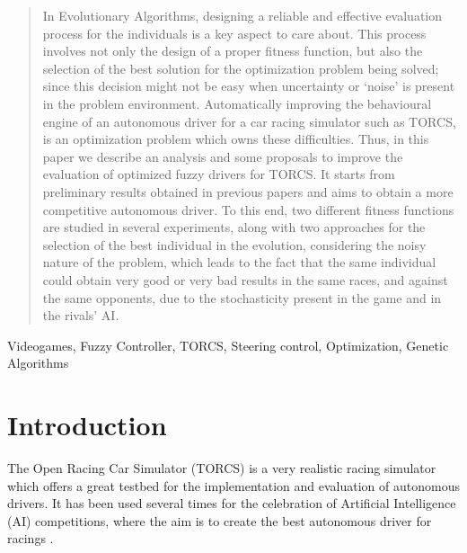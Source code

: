 \documentclass[conference]{IEEEtran}
\begin{document}
\begin{abstract}
	
In Evolutionary Algorithms, designing a reliable and effective evaluation process for the individuals is a key aspect to care about. This process involves not only the design of a proper fitness function, but also the selection of the best solution for the optimization problem being solved; since this decision might not be easy when uncertainty or `noise' is present in the problem environment.
Automatically improving the behavioural engine of an autonomous driver for a car racing simulator such as TORCS, is an optimization problem which owns these difficulties. 
Thus, in this paper we describe an analysis and some proposals to improve the evaluation of optimized fuzzy drivers for TORCS. It starts from preliminary results obtained in previous papers and aims to obtain a more competitive autonomous driver.
To this end, two different fitness functions are studied in several experiments, along with two  
approaches for the selection of the best individual in the evolution, considering the noisy nature of the problem, which leads to the fact that the same individual could obtain very good or very bad results in the same races, and against the same opponents, due to the stochasticity present in the game and in the rivals' AI.
\end{abstract}
\begin{IEEEkeywords}
Videogames, Fuzzy Controller, TORCS, Steering control, Optimization, Genetic Algorithms
\end{IEEEkeywords}
%
\section{Introduction}
\label{sec:intro}

The Open Racing Car Simulator (TORCS) \cite{WebTORCS} is a very realistic racing simulator which offers a great testbed for the implementation and evaluation of autonomous drivers. 
It has been used several times for the celebration of Artificial Intelligence (AI) competitions, where the aim is to create the best autonomous driver for racings \cite{torcs5,manualTORCS,Torcs3,torcs7,oponnents2010}. 

\end{document}
